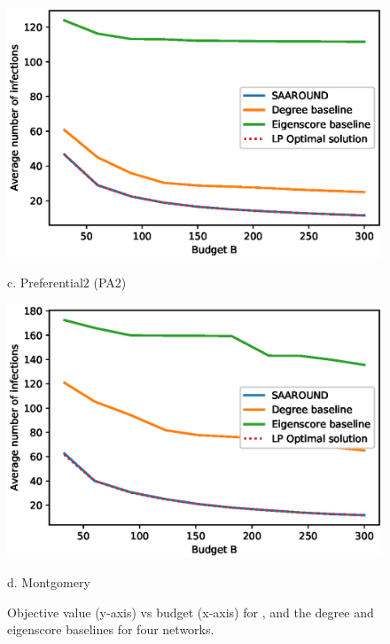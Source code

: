 \begin{figure}[ht]
\begin{minipage}[b]{0.5\linewidth}
    \centering
    \includegraphics[scale=0.48]{Figuresnew/barabasi_approx} 
    \caption*{c. Preferential2 (PA2)} 
    \vspace{1ex}
  \end{minipage}%
  \begin{minipage}[b]{0.5\linewidth}
    \centering
    \includegraphics[scale=0.48]{Figuresnew/mont_approx} 
    \caption*{d. Montgomery} 
    \vspace{1ex}
  \end{minipage}
  \caption{Objective value (y-axis) vs budget (x-axis) for \algo{}, and the degree and eigenscore baselines for four networks.}
  \label{fig:performance} 
\end{figure}

